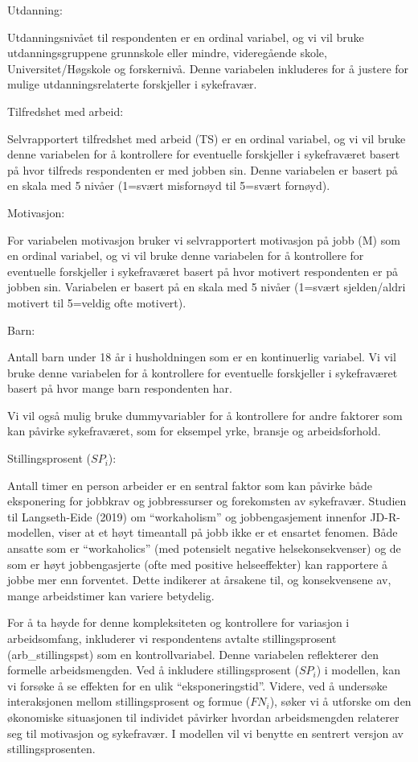 \documentclass[
  12pt,
  a4paper,
  DIV=11,
  numbers=noendperiod]{scrartcl}
\begin{document}
Utdanning:

Utdanningsnivået til respondenten er en ordinal variabel, og vi vil
bruke utdanningsgruppene grunnskole eller mindre, videregående skole,
Universitet/Høgskole og forskernivå. Denne variabelen inkluderes for å
justere for mulige utdanningsrelaterte forskjeller i sykefravær.

Tilfredshet med arbeid:

Selvrapportert tilfredshet med arbeid (TS) er en ordinal variabel, og vi
vil bruke denne variabelen for å kontrollere for eventuelle forskjeller
i sykefraværet basert på hvor tilfreds respondenten er med jobben sin.
Denne variabelen er basert på en skala med 5 nivåer (1=svært misfornøyd
til 5=svært fornøyd).

Motivasjon:

For variabelen motivasjon bruker vi selvrapportert motivasjon på jobb
(M) som en ordinal variabel, og vi vil bruke denne variabelen for å
kontrollere for eventuelle forskjeller i sykefraværet basert på hvor
motivert respondenten er på jobben sin. Variabelen er basert på en skala
med 5 nivåer (1=svært sjelden/aldri motivert til 5=veldig ofte
motivert).

Barn:

Antall barn under 18 år i husholdningen som er en kontinuerlig variabel.
Vi vil bruke denne variabelen for å kontrollere for eventuelle
forskjeller i sykefraværet basert på hvor mange barn respondenten har.

Vi vil også mulig bruke dummyvariabler for å kontrollere for andre
faktorer som kan påvirke sykefraværet, som for eksempel yrke, bransje og
arbeidsforhold.

Stillingsprosent (\(SP_i\)):

Antall timer en person arbeider er en sentral faktor som kan påvirke
både eksponering for jobbkrav og jobbressurser og forekomsten av
sykefravær. Studien til Langseth-Eide (2019) om ``workaholism'' og
jobbengasjement innenfor JD-R-modellen, viser at et høyt timeantall på
jobb ikke er et ensartet fenomen. Både ansatte som er ``workaholics''
(med potensielt negative helsekonsekvenser) og de som er høyt
jobbengasjerte (ofte med positive helseeffekter) kan rapportere å jobbe
mer enn forventet. Dette indikerer at årsakene til, og konsekvensene av,
mange arbeidstimer kan variere betydelig.

For å ta høyde for denne kompleksiteten og kontrollere for variasjon i
arbeidsomfang, inkluderer vi respondentens avtalte stillingsprosent
(arb\_stillingspst) som en kontrollvariabel. Denne variabelen
reflekterer den formelle arbeidsmengden. Ved å inkludere
stillingsprosent (\(SP_i\)) i modellen, kan vi forsøke å se effekten for
en ulik ``eksponeringstid''. Videre, ved å undersøke interaksjonen
mellom stillingsprosent og formue (\(FN_i\)), søker vi å utforske om den
økonomiske situasjonen til individet påvirker hvordan arbeidsmengden
relaterer seg til motivasjon og sykefravær. I modellen vil vi benytte en
sentrert versjon av stillingsprosenten.
\end{document}
